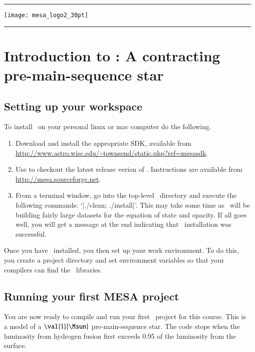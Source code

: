 \DefineShortVerb{\|}

\newpage

\begin{center}
\rule[10pt]{60pt}{1pt}\texttt{[image: mesa\_logo2\_30pt]}\rule[10pt]{60pt}{1pt}
\end{center}

\section{Introduction to \mesa: A contracting pre-main-sequence star}

\subsection{Setting up your workspace}

To install \mesa\ on your personal linux or mac computer do the following.
\begin{enumerate}
	\item Download and install the appropriate SDK, available from \url{http://www.astro.wisc.edu/~townsend/static.php?ref=mesasdk}. 
	\item Use  to checkout the latest release verion of \MESA. Instructions are available from \url{http://mesa.sourceforge.net}.
	\item From a terminal window, go into the top-level \mesa\ directory and execute the following commands: `|./clean; ./install|'.  This may take some time as \mesa\ will be building fairly large datasets for the equation of state and opacity.  If all goes well, you will get a message at the end indicating that \mesa\ installation was successful.
\end{enumerate}

Once you have \mesa\ installed, you then set up your work environment. To do this, you create a project directory and set environment variables so that your  compilers can find the \mesa\ libraries.

\subsection{Running your first MESA project}

You are now ready to compile and run your first \mesa\ project for this course. This is a model of a $\val{1}{\Msun}$ pre-main-sequence star. The code stops when the luminosity from hydrogen fusion first exceeds 0.95 of the luminosity from the surface. 


